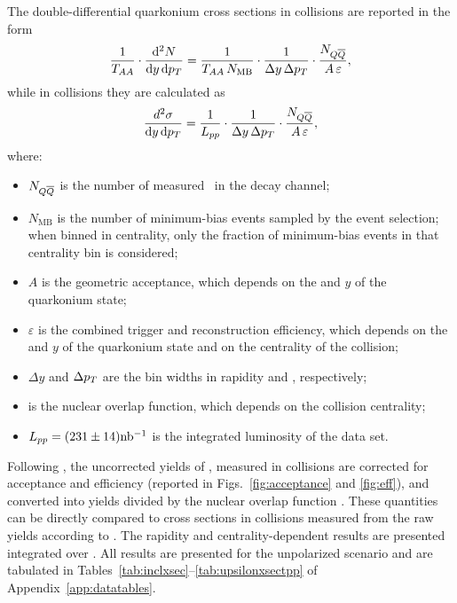 The double-differential quarkonium cross sections in \PbPb collisions
are reported in the form
\begin{equation}
  \label{eq:xsection}
    \frac{1}{T_{AA}} \cdot
    \frac{\mathrm{d}^2N}{\mathrm{d}y\,\mathrm{d}p_T} = \frac{1}{T_{AA}\, N_{\text{MB}}} \cdot \frac{1}{\Delta y\, \Delta p_T} \cdot \frac{N_{Q \overline{Q}}}{A\, \varepsilon},
\end{equation}
while in \pp collisions they are calculated as
\begin{equation}
  \label{eq:xsection_pp}
    \frac{d^2\sigma}{\mathrm{d}y\,\mathrm{d}p_T} = \frac{1}{L_{{pp}}} \cdot \frac{1}{\Delta y\, \Delta p_T} \cdot \frac{N_{Q \overline{Q}}}{A\, \varepsilon},
\end{equation}
where:
\begin{itemize}
\item $N_{Q \overline{Q}}$ is the number of measured \PgUa\ in the \mumu decay channel;
\item $N_{\text{MB}}$ is the number of minimum-bias events sampled by
  the event selection; when binned in centrality, only the fraction of
  minimum-bias events in that centrality bin is considered;
\item $A$ is the geometric acceptance, which depends on the \pt and $y$
  of the quarkonium state;
\item $\varepsilon$ is the combined trigger and reconstruction
  efficiency, which depends on the \pt and $y$ of the quarkonium state
  and on the centrality of the collision;
\item $\Delta y$ and $\Delta p_T$ are the bin widths in rapidity and
  \pt, respectively;
\item \taa is the nuclear overlap function, which depends on the
  collision centrality;
\item $L_{{pp}} = (231\pm14) \rm nb^{-1}$ is the integrated luminosity of
  the \pp data set.
\end{itemize}

Following , the uncorrected yields of \PgUa, measured in \PbPb collisions
are corrected for acceptance and efficiency (reported in
Figs.~\ref{fig:acceptance} and \ref{fig:eff}), and converted into
yields divided by the nuclear overlap function \taa. These quantities
can be directly compared to cross sections in \pp collisions measured
from the raw yields according to . The rapidity and
centrality-dependent results are presented integrated over \pt. All
results are presented for the unpolarized scenario and are tabulated
in Tables~\ref{tab:inclxsec}--\ref{tab:upsilonxsectpp} of
Appendix~\ref{app:datatables}.

